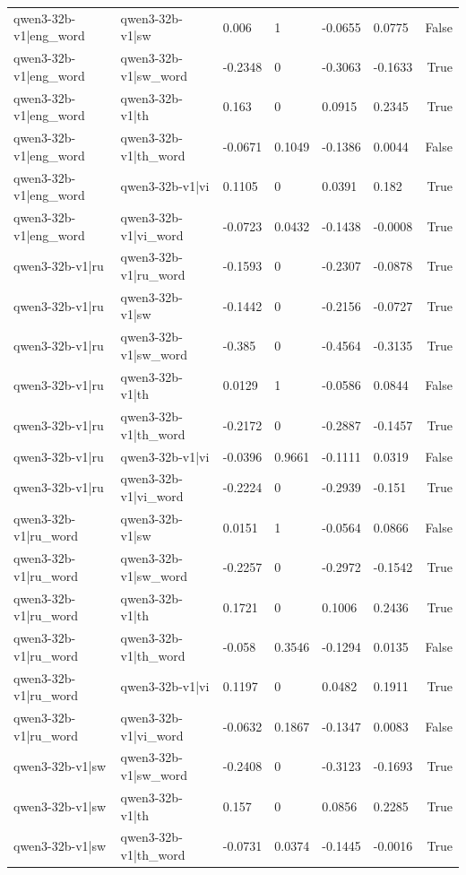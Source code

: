 \begin{table}
\begin{tabular}{llllllr}
qwen3-32b-v1|eng_word & qwen3-32b-v1|sw & 0.006 & 1 & -0.0655 & 0.0775 & False \\
qwen3-32b-v1|eng_word & qwen3-32b-v1|sw_word & -0.2348 & 0 & -0.3063 & -0.1633 & True \\
qwen3-32b-v1|eng_word & qwen3-32b-v1|th & 0.163 & 0 & 0.0915 & 0.2345 & True \\
qwen3-32b-v1|eng_word & qwen3-32b-v1|th_word & -0.0671 & 0.1049 & -0.1386 & 0.0044 & False \\
qwen3-32b-v1|eng_word & qwen3-32b-v1|vi & 0.1105 & 0 & 0.0391 & 0.182 & True \\
qwen3-32b-v1|eng_word & qwen3-32b-v1|vi_word & -0.0723 & 0.0432 & -0.1438 & -0.0008 & True \\
qwen3-32b-v1|ru & qwen3-32b-v1|ru_word & -0.1593 & 0 & -0.2307 & -0.0878 & True \\
qwen3-32b-v1|ru & qwen3-32b-v1|sw & -0.1442 & 0 & -0.2156 & -0.0727 & True \\
qwen3-32b-v1|ru & qwen3-32b-v1|sw_word & -0.385 & 0 & -0.4564 & -0.3135 & True \\
qwen3-32b-v1|ru & qwen3-32b-v1|th & 0.0129 & 1 & -0.0586 & 0.0844 & False \\
qwen3-32b-v1|ru & qwen3-32b-v1|th_word & -0.2172 & 0 & -0.2887 & -0.1457 & True \\
qwen3-32b-v1|ru & qwen3-32b-v1|vi & -0.0396 & 0.9661 & -0.1111 & 0.0319 & False \\
qwen3-32b-v1|ru & qwen3-32b-v1|vi_word & -0.2224 & 0 & -0.2939 & -0.151 & True \\
qwen3-32b-v1|ru_word & qwen3-32b-v1|sw & 0.0151 & 1 & -0.0564 & 0.0866 & False \\
qwen3-32b-v1|ru_word & qwen3-32b-v1|sw_word & -0.2257 & 0 & -0.2972 & -0.1542 & True \\
qwen3-32b-v1|ru_word & qwen3-32b-v1|th & 0.1721 & 0 & 0.1006 & 0.2436 & True \\
qwen3-32b-v1|ru_word & qwen3-32b-v1|th_word & -0.058 & 0.3546 & -0.1294 & 0.0135 & False \\
qwen3-32b-v1|ru_word & qwen3-32b-v1|vi & 0.1197 & 0 & 0.0482 & 0.1911 & True \\
qwen3-32b-v1|ru_word & qwen3-32b-v1|vi_word & -0.0632 & 0.1867 & -0.1347 & 0.0083 & False \\
qwen3-32b-v1|sw & qwen3-32b-v1|sw_word & -0.2408 & 0 & -0.3123 & -0.1693 & True \\
qwen3-32b-v1|sw & qwen3-32b-v1|th & 0.157 & 0 & 0.0856 & 0.2285 & True \\
qwen3-32b-v1|sw & qwen3-32b-v1|th_word & -0.0731 & 0.0374 & -0.1445 & -0.0016 & True \\

\end{tabular}
\end{table}
